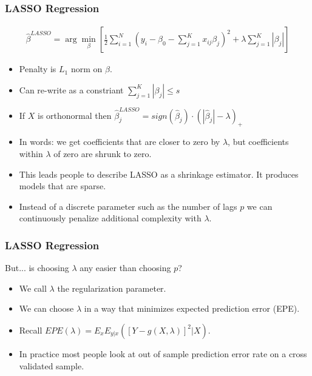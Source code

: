 \begin{frame}
\frametitle{LASSO Regression}
\begin{eqnarray*}
\hat{\beta}^{LASSO} = \arg \min_{\beta} \left[\frac{1}{2} \sum_{i=1}^N (y_i - \beta_0 - \sum_{j=1}^K x_{ij} \beta_j)^2 + \lambda \sum_{j=1}^K | \beta_j| \right]
\end{eqnarray*}
\begin{itemize}
\item Penalty is $L_1$ norm on $\beta$.
\item Can re-write as a constriant  $\sum_{j=1}^K | \beta_j| \leq s$
\item If $X$ is orthonormal then $\hat{\beta}_{j}^{LASSO} = sign(\hat{\beta}_j ) \cdot (| \hat{\beta}_j |- \lambda )_{+}$
\item In words: we get coefficients that are closer to zero by $\lambda$, but coefficients within $\lambda$ of zero are shrunk to zero.
\item This leads people to describe LASSO as a \alert{shrinkage} estimator. It produces models that are \alert{sparse}.
\item Instead of a discrete parameter such as the number of lags $p$ we can continuously penalize additional complexity with $\lambda$.
\end{itemize}
\end{frame}


\begin{frame}
\frametitle{LASSO Regression}
But... is choosing $\lambda$ any easier than choosing $p$?
\begin{itemize}
\item We call $\lambda$ the \alert{regularization} parameter.
\item We can choose $\lambda$ in a way that minimizes expected prediction error (EPE).
\item Recall $EPE(\lambda) = E_x E_{y|x} ([ Y- g(X,\lambda)]^2 | X)$.
\item In practice most people look at out of sample prediction error rate on a \alert{cross validated sample}.
\end{itemize}
\end{frame}

